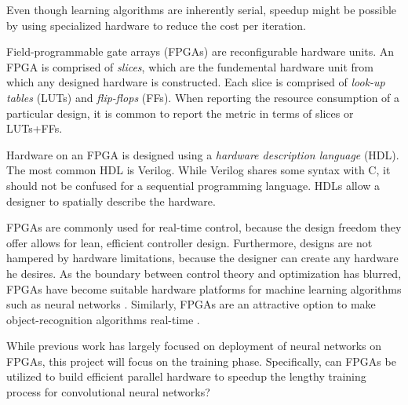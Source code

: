 Even though learning algorithms are inherently serial, speedup might be possible by using specialized hardware to reduce the cost per iteration.

Field-programmable gate arrays (FPGAs) are reconfigurable hardware units. An FPGA is comprised of \textit{slices}, which are the fundemental hardware unit from which any designed hardware is constructed. Each slice is comprised of \textit{look-up tables} (LUTs) and \textit{flip-flops} (FFs). When reporting the resource consumption of a particular design, it is common to report the metric in terms of slices or LUTs+FFs.

Hardware on an FPGA is designed using a \textit{hardware description language} (HDL). The most common HDL is Verilog. While Verilog shares some syntax with C, it should not be confused for a sequential programming language. HDLs allow a designer to spatially describe the hardware.

FPGAs are commonly used for real-time control, because the design freedom they offer allows for lean, efficient controller design. Furthermore, designs are not hampered by hardware limitations, because the designer can create any hardware he desires. As the boundary between control theory and optimization has blurred, FPGAs have become suitable hardware platforms for machine learning algorithms such as neural networks \cite{wang2008} \cite{skodzik2013}. Similarly, FPGAs are an attractive option to make object-recognition algorithms real-time \cite{ahn2015}.

While previous work has largely focused on deployment of neural networks on FPGAs, this project will focus on the training phase. Specifically, can FPGAs be utilized to build efficient parallel hardware to speedup the lengthy training process for convolutional neural networks?